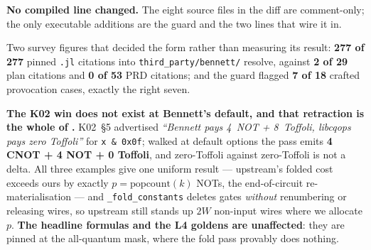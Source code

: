 \noindent\textbf{No compiled line changed.} The eight source files in the diff
are comment-only; the only executable additions are the guard and the two lines
that wire it in.

\begin{figures}
\end{figures}

\noindent Two survey figures that decided the  form rather than
measuring its result: \textbf{277 of 277} pinned \texttt{.jl} citations into
\texttt{third\_party/bennett/} resolve, against \textbf{2 of 29} plan citations
and \textbf{0 of 53} PRD citations; and the guard flagged \textbf{7 of 18}
crafted provocation cases, exactly the right seven.

\medskip
\noindent\textbf{The K02 win does not exist at Bennett's default, and that
retraction is the whole of .} K02~§5 advertised \emph{``Bennett pays
4~NOT + 8~Toffoli, libcqops pays zero Toffoli''} for \texttt{x \& 0x0f}; walked
at default options the pass emits \textbf{4 CNOT + 4 NOT + 0 Toffoli}, and
zero-Toffoli against zero-Toffoli is not a delta. All three examples give one
uniform result --- upstream's folded cost exceeds ours by exactly
$p = \mathrm{popcount}(k)$ NOTs, the end-of-circuit re-materialisation --- and
\texttt{\_fold\_constants} deletes gates \emph{without} renumbering or releasing
wires, so upstream still stands up $2W$ non-input wires where we allocate $p$.
\textbf{The headline formulas and the L4 goldens are unaffected}: they are pinned
at the all-quantum mask, where the fold pass provably does nothing.

